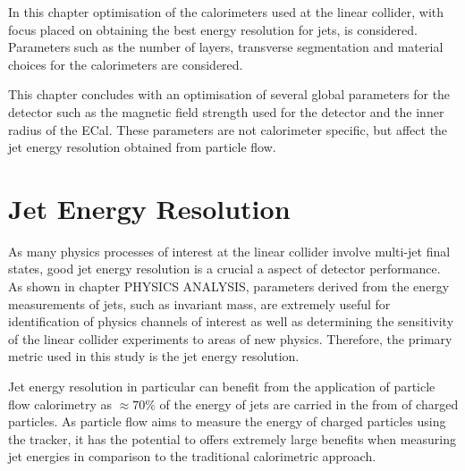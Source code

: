 In this chapter optimisation of the calorimeters used at the linear collider, with focus placed on obtaining the best energy resolution for jets, is considered.  Parameters such as the number of layers, transverse segmentation and material choices for the calorimeters are considered.  

This chapter concludes with an optimisation of several global parameters for the detector such as the magnetic field strength used for the detector and the inner radius of the ECal.  These parameters are not calorimeter specific, but affect the jet energy resolution obtained from particle flow. 


\section{Jet Energy Resolution}
\label{sec:optstudiesmetric}
As many physics processes of interest at the linear collider involve multi-jet final states, good jet energy resolution is a crucial a aspect of detector performance.  As shown in chapter PHYSICS ANALYSIS, parameters derived from the energy measurements of jets, such as invariant mass, are extremely useful for identification of physics channels of interest as well as determining the sensitivity of the linear collider experiments to areas of new physics.  Therefore, the primary metric used in this study is the jet energy resolution.

Jet energy resolution in particular can benefit from the application of particle flow calorimetry as $\approx 70 \%$ of the energy of jets are carried in the from of charged particles.  As particle flow aims to measure the energy of charged particles using the tracker, it has the potential to offers extremely large benefits when measuring jet energies in comparison to the traditional calorimetric approach.  


